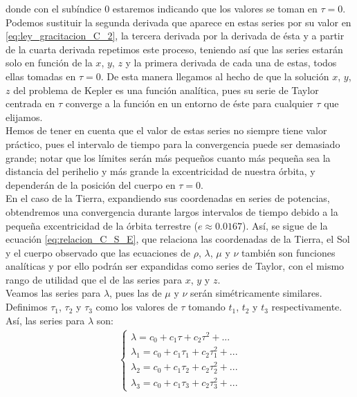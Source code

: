 \documentclass[11pt]{article}
\begin{document}
\noindent donde con el subíndice 0 estaremos indicando que los valores se toman en $\tau=0$. Podemos sustituir la segunda derivada que aparece en estas series por su valor en \eqref{eq:ley_gracitacion_C_2}, la tercera derivada por la derivada de ésta y a partir de la cuarta derivada repetimos este proceso, teniendo así que las series estarán solo en función de la $x$, $y$, $z$ y la primera derivada de cada una de estas, todos ellas tomadas en $\tau=0$.  De esta manera llegamos al hecho de que la solución $x$, $y$, $z$ del problema de Kepler es una función analítica, pues su serie de Taylor centrada en $\tau$ converge a la función en un entorno de éste para cualquier $\tau$ que elijamos.\\

Hemos de tener en cuenta que el valor de estas series no siempre tiene valor práctico, pues el intervalo de tiempo para la convergencia puede ser demasiado grande; notar que los límites serán más pequeños cuanto más pequeña sea la distancia del perihelio y más grande la excentricidad de nuestra órbita, y dependerán de la posición del cuerpo en $\tau=0$.\\

En el caso de la Tierra, expandiendo sus coordenadas en series de potencias, obtendremos una convergencia durante largos intervalos de tiempo debido a la pequeña excentricidad de la órbita terrestre ($e\approx0.0167$). Así, se sigue de la ecuación \eqref{eq:relacion_C_S_E}, que relaciona las coordenadas de la Tierra, el Sol y el cuerpo observado que las ecuaciones de $\rho$, $\lambda$, $\mu$ y $\nu$ también son funciones analíticas y por ello podrán ser expandidas como series de Taylor, con el mismo rango de utilidad que el de las series para $x$, $y$ y $z$.\\

Veamos las series para $\lambda$, pues las de $\mu$ y $\nu$ serán simétricamente similares. Definimos $\tau_1$, $\tau_2$ y $\tau_3$ como los valores de $\tau$ tomando $t_1$, $t_2$ y $t_3$ respectivamente. Así, las series para $\lambda$ son:
\begin{align}
\left\{
\begin{array}{l}
\lambda=c_0+c_1\tau+c_2\tau^2+...\\
\lambda_1=c_0+c_1\tau_1+c_2\tau_1^2+...\\
\lambda_2=c_0+c_1\tau_2+c_2\tau_2^2+...\\
\lambda_3=c_0+c_1\tau_3+c_2\tau_3^2+...
\end{array}
\right.
\label{eq:series_lambda}
\end{align}
\end{document}
